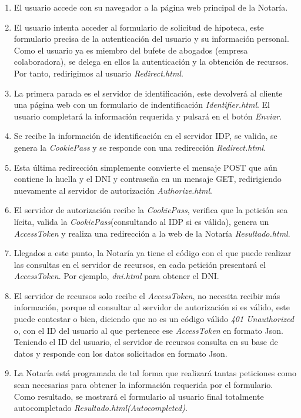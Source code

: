 \documentclass[a4,12pt,onecolum]{article}
\begin{document}
\begin{enumerate}
	\item El usuario accede con su navegador a la página web principal de la Notaría.
	
	\item El usuario intenta acceder al formulario de solicitud de hipoteca, este formulario precisa de la 			autenticación del usuario y su información personal. Como el usuario ya es miembro del bufete de abogados 		(empresa colaboradora), se delega en ellos la autenticación y la obtención de recursos. Por tanto, 				redirigimos al usuario	\emph{Redirect.html}.
	
	\item La primera parada es el servidor de identificación, este devolverá al cliente una página web con un 		formulario de indentificación \emph{Identifier.html}. El usuario completará la información requerida y 			pulsará en el botón \emph{Enviar}.
	
	\item Se recibe la información de identificación en el servidor IDP, se valida, se genera la 					\emph{CookiePass} y se responde con una redirección \emph{Redirect.html}.
	
	\item Esta última redirección simplemente convierte el mensaje POST que aún contiene la huella y el DNI y 		contraseña en un mensaje GET, redirigiendo nuevamente al servidor de autorización \emph{Authorize.html}.
	
	\item El servidor de autorización recibe la \emph{CookiePass}, verifica que la petición sea lícita, valida 		la \emph{CookiePass}(consultando al IDP si es válida), genera un \emph{AccessToken} y realiza una 				redirección a la web de la Notaría \emph{Resultado.html}. 
	
	\item Llegados a este punto, la Notaría ya tiene el código con el que puede realizar las consultas en el 		servidor de recursos, en cada petición presentará el \emph{AccessToken}. Por ejemplo, \emph{dni.html} para 		obtener el DNI.
	
	\item El servidor de recursos solo recibe el \emph{AccessToken}, no necesita recibir más información, 			porque al consultar al servidor de autorización si es válido, este puede contestar o bien, diciendo que no 		es un código válido \emph{401 Unauthorized} o, con el ID del usuario al que pertenece ese 						\emph{AccessToken} en formato Json. Teniendo el ID del usuario, el servidor de recursos consulta en su base 	de datos y responde con los datos solicitados en formato Json.
	
	\item La Notaría está programada de tal forma que realizará tantas peticiones como sean necesarias para 		obtener la información requerida por el formulario. Como resultado, se mostrará el formulario al usuario 		final totalmente autocompletado \emph{Resultado.html(Autocompleted)}.
	
	
\end{enumerate}
\end{document}
